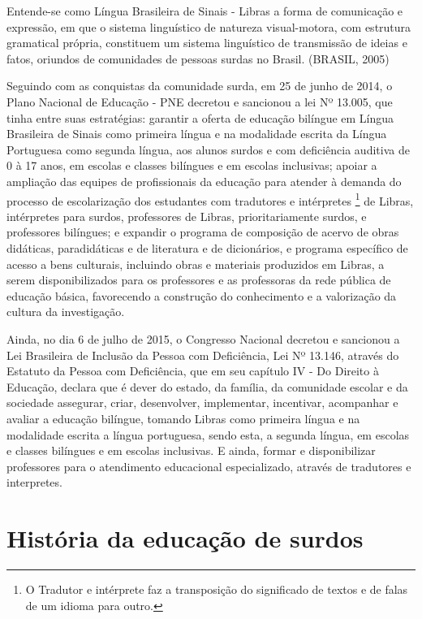 \documentclass[brasil]{abnt}
\begin{document}
				\begin{citacao} Entende-se como Língua Brasileira de Sinais - Libras a forma de comunicação e expressão, em que o sistema linguístico de natureza visual-motora, com estrutura gramatical própria, constituem
								um sistema linguístico de transmissão de ideias e fatos, 
								oriundos de comunidades de pessoas surdas no Brasil. 
								(BRASIL, 2005)
				\end{citacao}
				
		Seguindo com as conquistas da comunidade surda, em 25 de junho de 
		2014, o Plano Nacional de Educação - PNE decretou e sancionou a lei 
		Nº 13.005, que tinha entre suas estratégias: garantir a
		oferta de educação bilíngue em Língua Brasileira de Sinais 
		como primeira língua e na modalidade escrita da Língua Portuguesa como segunda língua, aos alunos surdos e com deficiência auditiva de 0 à 17 anos, em escolas e classes bilíngues e em escolas 
		inclusivas; apoiar a ampliação das equipes de profissionais da educação para atender à demanda do processo de escolarização dos estudantes com tradutores e intérpretes
		\footnote{O Tradutor e intérprete faz a transposição do significado de textos e de falas de um idioma para outro.}
		de Libras, intérpretes para surdos, 
		professores de Libras, prioritariamente surdos, e professores bilíngues; e expandir o programa de composição de acervo de obras didáticas, paradidáticas e de literatura e de dicionários, e programa 
		específico de acesso a bens culturais, incluindo obras e materiais produzidos em Libras, a serem disponibilizados para os professores e as professoras da rede pública de educação básica, favorecendo a 
		construção do conhecimento e a valorização da cultura da investigação.
				
		Ainda, no dia 6 de julho de 2015, o Congresso Nacional decretou e sancionou a Lei Brasileira de Inclusão da Pessoa com Deficiência, Lei Nº 13.146, através do Estatuto da Pessoa com Deficiência, que em seu 
		capítulo IV - Do Direito à Educação, declara que é dever do estado, da família, da comunidade escolar e da sociedade assegurar, criar, desenvolver, implementar, incentivar, acompanhar e avaliar a 
		educação bilíngue, tomando Libras como primeira língua e na modalidade escrita a língua portuguesa, sendo esta, a segunda língua, em escolas e classes bilíngues e em escolas inclusivas. E ainda, formar
		e disponibilizar professores para o atendimento educacional especializado, através de tradutores e interpretes.   
				

\chapter{História da educação de surdos}
	
\end{document}
